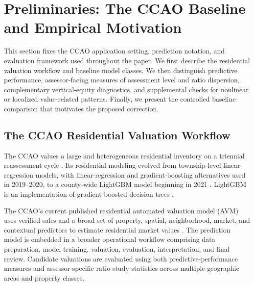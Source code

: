 \documentclass[10pt]{article}
\theoremstyle{definition}
\newcommand{\1}{\mathbf{1}}
\begin{document}
\section{Preliminaries: The CCAO Baseline and Empirical Motivation}
\label{sec:setting}


{This section fixes the CCAO application setting, prediction notation, and evaluation framework used throughout the paper. We first describe the residential valuation workflow and baseline model classes. We then distinguish predictive performance, assessor-facing measures of assessment level and ratio dispersion, complementary vertical-equity diagnostics, and supplemental checks for nonlinear or localized value-related patterns. Finally, we present the controlled baseline comparison that motivates the proposed correction.}


\subsection{The CCAO Residential Valuation Workflow}
\label{subsec:ccao_workflow}

The CCAO values a large and heterogeneous residential inventory on a triennial reassessment cycle \cite{CCAOAssessmentCalendar2026}. Its residential modeling evolved from township-level linear-regression models, with linear-regression and gradient-boosting alternatives used in 2019--2020, to a county-wide LightGBM model beginning in 2021 \cite{CCAOModelResAVM2026}. LightGBM is an implementation of gradient-boosted decision trees \cite{lightgbm}.

The CCAO's current published residential automated valuation model (AVM) uses verified sales and a broad set of property, spatial, neighborhood, market, and contextual predictors to estimate residential market values \cite{CCAOModelResAVM2026}. The prediction model is embedded in a broader operational workflow comprising data preparation, model training, valuation, evaluation, interpretation, and final review. Candidate valuations are evaluated using both predictive-performance measures and assessor-specific ratio-study statistics across multiple geographic areas and property classes.
\end{document}
